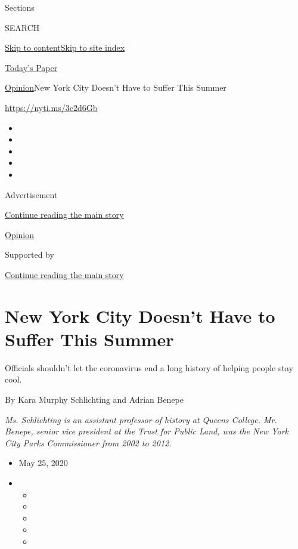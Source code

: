 Sections

SEARCH

\protect\hyperlink{site-content}{Skip to
content}\protect\hyperlink{site-index}{Skip to site index}

\href{https://myaccount.nytimes3xbfgragh.onion/auth/login?response_type=cookie\&client_id=vi}{}

\href{https://www.nytimes3xbfgragh.onion/section/todayspaper}{Today's
Paper}

\href{/section/opinion}{Opinion}\textbar{}New York City Doesn't Have to
Suffer This Summer

\url{https://nyti.ms/3c2d6Gb}

\begin{itemize}
\item
\item
\item
\item
\item
\end{itemize}

Advertisement

\protect\hyperlink{after-top}{Continue reading the main story}

\href{/section/opinion}{Opinion}

Supported by

\protect\hyperlink{after-sponsor}{Continue reading the main story}

\hypertarget{new-york-city-doesnt-have-to-suffer-this-summer}{%
\section{New York City Doesn't Have to Suffer This
Summer}\label{new-york-city-doesnt-have-to-suffer-this-summer}}

Officials shouldn't let the coronavirus end a long history of helping
people stay cool.

By Kara Murphy Schlichting and Adrian Benepe

\emph{Ms. Schlichting is an assistant professor of history at Queens
College. Mr. Benepe, senior vice president at the Trust for Public Land,
was the New York City Parks Commissioner from 2002 to 2012.}

\begin{itemize}
\item
  May 25, 2020
\item
  \begin{itemize}
  \item
  \item
  \item
  \item
  \item
  \end{itemize}
\end{itemize}

